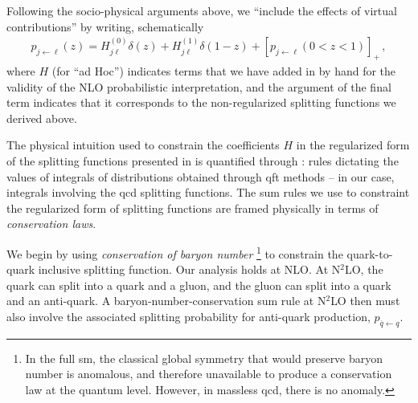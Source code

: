 Following the socio-physical arguments above, we ``include the effects of virtual contributions'' by writing, schematically
\begin{align}
    \label{eq:start-regularizing}
    p_{j\leftarrow \ell}(z)
    =
    H^{(0)}_{j\ell} \delta(z)
    +
    H^{(1)}_{j\ell} \delta(1-z)
    +
    [p_{j\leftarrow \ell}(0<z<1)]_+
    \,,
\end{align}
where \(H\) (for ``ad Hoc'') indicates terms that we have added in by hand for the validity of the NLO probabilistic interpretation, and the argument of the final term indicates that it corresponds to the non-regularized splitting functions we derived above.


The physical intuition used to constrain the coefficients \(H\) in the regularized form of the splitting functions presented in  is quantified through :
%
rules dictating the values of integrals of distributions obtained through \gls{qft} methods -- in our case, integrals involving the \gls{qcd} splitting functions.
%
The sum rules we use to constraint the regularized form of splitting functions are framed physically in terms of \textit{conservation laws}.


We begin by using \emph{conservation of baryon number}%
\footnote{
    In the full \gls{sm}, the classical global symmetry that would preserve baryon number is anomalous, and therefore unavailable to produce a conservation law at the quantum level.
    However, in massless \gls{qcd}, there is no anomaly.
}
%
to constrain the quark-to-quark inclusive splitting function.
%
Our analysis holds at NLO.
%
At N\(^2\)LO, the quark can split into a quark and a gluon, and the gluon can split into a quark and an anti-quark.
%
A baryon-number-conservation sum rule at N\(^2\)LO then must also involve the associated splitting probability for anti-quark production, \(p_{\overline{q} \leftarrow q}\).

